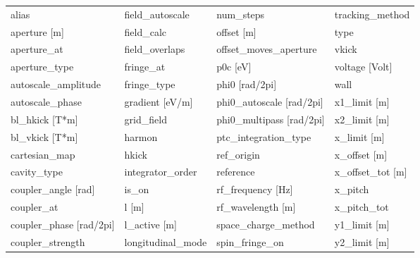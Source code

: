  \begin{tabular}{llll} \toprule
alias                            & field_autoscale                  & num_steps                        & tracking_method                  \\
aperture [m]                     & field_calc                       & offset [m]                       & type                             \\
aperture_at                      & field_overlaps                   & offset_moves_aperture            & vkick                            \\
aperture_type                    & fringe_at                        & p0c [eV]                         & voltage [Volt]                   \\
autoscale_amplitude              & fringe_type                      & phi0 [rad/2pi]                   & wall                             \\
autoscale_phase                  & gradient [eV/m]                  & phi0_autoscale [rad/2pi]         & x1_limit [m]                     \\
bl_hkick [T*m]                   & grid_field                       & phi0_multipass [rad/2pi]         & x2_limit [m]                     \\
bl_vkick [T*m]                   & harmon                           & ptc_integration_type             & x_limit [m]                      \\
cartesian_map                    & hkick                            & ref_origin                       & x_offset [m]                     \\
cavity_type                      & integrator_order                 & reference                        & x_offset_tot [m]                 \\
coupler_angle [rad]              & is_on                            & rf_frequency [Hz]                & x_pitch                          \\
coupler_at                       & l [m]                            & rf_wavelength [m]                & x_pitch_tot                      \\
coupler_phase [rad/2pi]          & l_active [m]                     & space_charge_method              & y1_limit [m]                     \\
coupler_strength                 & longitudinal_mode                & spin_fringe_on                   & y2_limit [m]                     \\

\end{tabular}
